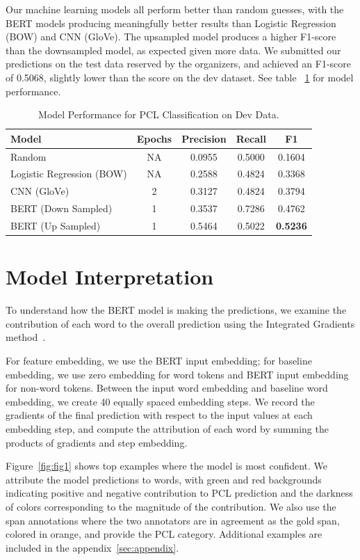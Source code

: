 \documentclass[11pt]{article}
\begin{document}
Our machine learning models all perform better than random guesses, with the BERT models producing meaningfully better results than Logistic Regression (BOW) and CNN (GloVe). The upsampled model produces a higher F1-score than the downsampled model, as expected given more data. We submitted our predictions on the test data reserved by the organizers, and achieved an F1-score of 0.5068, slightly lower than the score on the dev dataset. See table ~\ref{tab:perf} for model performance.


\begin{table}
\centering
\begin{tabular}{lcccc}
\hline
\textbf{Model} & \textbf{Epochs} & \textbf{Precision} & \textbf{Recall} & \textbf{F1} \\
\hline
Random & NA & 0.0955 & 0.5000 & 0.1604  \\
Logistic Regression (BOW) & NA & 0.2588 & 0.4824 & 0.3368  \\
CNN (GloVe) & 2 & 0.3127 & 0.4824 & 0.3794  \\
BERT (Down Sampled) & 1 & 0.3537 & 0.7286 & 0.4762  \\
BERT (Up Sampled) & 1 & 0.5464 & 0.5022 & \textbf{0.5236}  \\
\hline
\end{tabular}
\caption{Model Performance for PCL Classification on Dev Data.}
\label{tab:perf}
\end{table}

\section{Model Interpretation}

To understand how the BERT model is making the predictions, we examine the contribution of each word to the overall prediction using the Integrated Gradients method~\cite{sundararajan2017axiomatic}. 

For feature embedding, we use the BERT input embedding; for baseline embedding, we use zero embedding for word tokens and BERT input embedding for non-word tokens. Between the input word embedding and baseline word embedding, we create 40 equally spaced embedding steps. We record the gradients of the final prediction with respect to the input values at each embedding step, and compute the attribution of each word by summing the products of gradients and step embedding.

Figure~\ref{fig:fig1} shows top examples where the model is most confident. We attribute the model predictions to words, with green and red backgrounds indicating positive and negative contribution to PCL prediction and the darkness of colors corresponding to the magnitude of the contribution. We also use the span annotations where the two annotators are in agreement as the gold span, colored in orange, and provide the PCL category. Additional examples are included in the appendix~\ref{sec:appendix}.
\end{document}
